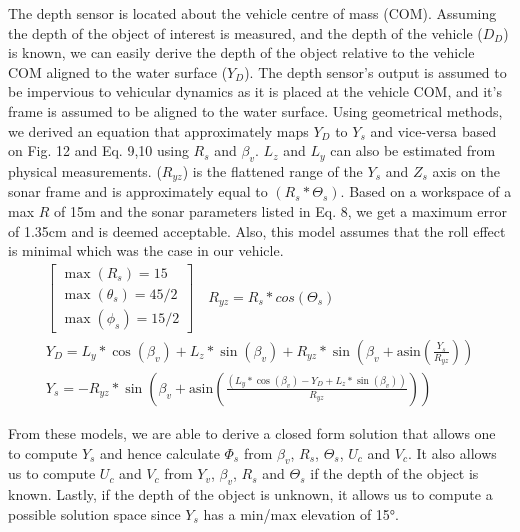 \documentclass[a4paper]{IEEEtran}
\let\Theta\varTheta
\let\Phi\varPhi
\newcommand{\RSonar}{$\si{\textit{R}_{s}}$\xspace}
\newcommand{\ThetaSonar}{$\si{\Theta_{s}}$\xspace}
\newcommand{\PhiSonar}{$\si{\Phi_{s}}$\xspace}
\newcommand{\UCamera}{$\si{\textit{U}_{c}}$\xspace}
\newcommand{\VCamera}{$\si{\textit{V}_{c}}$\xspace}
\newcommand{\YSonar}{$\si{\textit{Y}_{s}}$\xspace}
\newcommand{\Depth}{$D_{D}$\xspace}
\newcommand{\YDepth}{$Y_{D}$\xspace}
\newcommand{\YVehicle}{$\si{\textit{Y}_{v}}$\xspace}
\newcommand{\PitchVehicle}{${\beta_{v}}$\xspace}
\begin{document}
The depth sensor is located about the vehicle centre of mass (COM). Assuming the depth of the object of interest is measured, and the depth of the vehicle (\Depth) is known, we can easily derive the depth of the object relative to the vehicle COM aligned to the water surface (\YDepth). The depth sensor's output is assumed to be impervious to vehicular dynamics as it is placed at the vehicle COM, and it's frame is assumed to be aligned to the water surface. Using geometrical methods, we derived an equation that approximately maps \YDepth to \YSonar and vice-versa based on Fig. 12 and Eq. 9,10 using \RSonar and \PitchVehicle. $L_{z}$ and $L_{y}$ can also be estimated from physical measurements. ($R_{yz}$) is the flattened range of the $Y_{s}$ and $Z_{s}$ axis on the sonar frame and is approximately equal to $(R_{s}*\Theta_{s})$. Based on a workspace of a max $R$ of 15m and the sonar parameters listed in Eq. 8, we get a maximum error of 1.35cm and is deemed acceptable. Also, this model assumes that the roll effect is minimal which was the case in our vehicle.
\begingroup\makeatletter\def\f@size{7}\check@mathfonts
\begin{gather}
\left[\begin{array}{c}
\max\left(R_{s}\right)=15\\
\max\left(\theta_{s}\right)=45/2\\
\max\left(\phi_{s}\right)=15/2
\end{array}\right]\quad R_{yz}=R_{s}*cos(\Theta_{s})\\
Y_{D}=L_{y}*\cos\left(\beta_{v}\right)+L_{z}*\sin\left(\beta_{v}\right)+R_{yz}*\sin\left(\beta_{v}+\mbox{asin}\left(\frac{Y_{s}}{R_{yz}}\right)\right) \\
Y_{s}=-R_{yz}*\sin\left(\beta_{v}+\mbox{asin}\left(\frac{\left(L_{y}*\cos\left(\beta_{v}\right)-Y_{D}+L_{z}*\sin\left(\beta_{v}\right)\right)}{R_{yz}}\right)\right)
\end{gather}
\endgroup  


From these models, we are able to derive a closed form solution that allows one to compute \YSonar and hence calculate \PhiSonar from \PitchVehicle, \RSonar, \ThetaSonar, \UCamera and \VCamera.  It also allows us to compute \UCamera and \VCamera from \YVehicle, \PitchVehicle, \RSonar and \ThetaSonar if the depth of the object is known. Lastly, if the depth of the object is unknown, it allows us to compute a possible solution space since \YSonar has a min/max elevation of 15\si{\degree}.
\end{document}
